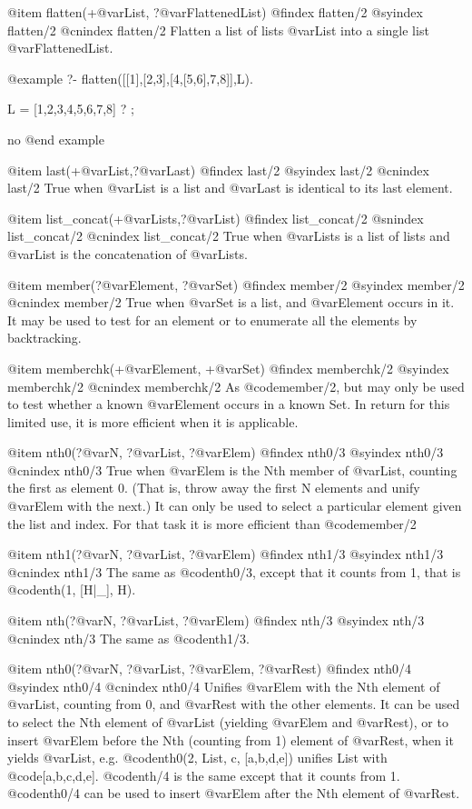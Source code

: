 {{{{{{{{{@item flatten(+@var{List}, ?@var{FlattenedList})
@findex flatten/2
@syindex flatten/2
@cnindex flatten/2
Flatten a list of lists @var{List} into a single list
@var{FlattenedList}.

@example
?- flatten([[1],[2,3],[4,[5,6],7,8]],L).

L = [1,2,3,4,5,6,7,8] ? ;

no
@end example

@item last(+@var{List},?@var{Last})
@findex last/2
@syindex last/2
@cnindex last/2
True when @var{List} is a list and @var{Last} is identical to its last element.

@item list_concat(+@var{Lists},?@var{List})
@findex list_concat/2
@snindex list_concat/2
@cnindex list_concat/2
True when @var{Lists} is a list of lists and @var{List} is the
concatenation of @var{Lists}.

@item member(?@var{Element}, ?@var{Set})
@findex member/2
@syindex member/2
@cnindex member/2
True when @var{Set} is a list, and @var{Element} occurs in it.  It may be used
to test for an element or to enumerate all the elements by backtracking.

@item memberchk(+@var{Element}, +@var{Set})
@findex memberchk/2
@syindex memberchk/2
@cnindex memberchk/2
As @code{member/2}, but may only be used to test whether a known
@var{Element} occurs in a known Set.  In return for this limited use, it
is more efficient when it is applicable.

@item nth0(?@var{N}, ?@var{List}, ?@var{Elem})
@findex nth0/3
@syindex nth0/3
@cnindex nth0/3
True when @var{Elem} is the Nth member of @var{List},
counting the first as element 0.  (That is, throw away the first
N elements and unify @var{Elem} with the next.)  It can only be used to
select a particular element given the list and index.  For that
task it is more efficient than @code{member/2}

@item nth1(?@var{N}, ?@var{List}, ?@var{Elem})
@findex nth1/3
@syindex nth1/3
@cnindex nth1/3
The same as @code{nth0/3}, except that it counts from
1, that is @code{nth(1, [H|_], H)}.

@item nth(?@var{N}, ?@var{List}, ?@var{Elem})
@findex nth/3
@syindex nth/3
@cnindex nth/3
The same as @code{nth1/3}.

@item nth0(?@var{N}, ?@var{List}, ?@var{Elem}, ?@var{Rest})
@findex nth0/4
@syindex nth0/4
@cnindex nth0/4
Unifies @var{Elem} with the Nth element of @var{List},
counting from 0, and @var{Rest} with the other elements.  It can be used
to select the Nth element of @var{List} (yielding @var{Elem} and @var{Rest}), or to
insert @var{Elem} before the Nth (counting from 1) element of @var{Rest}, when
it yields @var{List}, e.g. @code{nth0(2, List, c, [a,b,d,e])} unifies List with
@code{[a,b,c,d,e]}.  @code{nth/4} is the same except that it counts from 1.  @code{nth0/4}
can be used to insert @var{Elem} after the Nth element of @var{Rest}.

}}}}}}}}}

